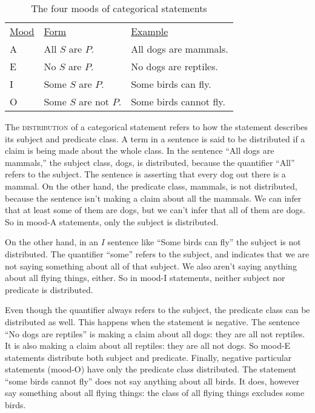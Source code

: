 \begin{table}[t]
\begin{tabu}{p{.1\linewidth}p{.3\linewidth}p{.3\linewidth}}
  \underline{Mood}& \underline{Form} & \underline{Example} \\
A & All $S$ are $P$.      & All dogs are mammals. \\
E & No $S$ are $P$.       & No dogs are reptiles. \\
I & Some $S$ are $P$.     & Some birds can fly. \\
O & Some $S$ are not $P$. & Some birds cannot fly.\\
\end{tabu}
\caption{The four moods of categorical statements}
\label{tab:moods}
\end{table}



The \textsc{\gls{distribution}} of a categorical statement refers to how the statement describes its subject and predicate class. A term in a sentence is said to be distributed \label{def:Distribution} if a claim is being made about the whole class. In the sentence ``All dogs are mammals,'' the subject class, dogs, is distributed, because the quantifier ``All'' refers to the subject. The sentence is asserting that every dog out there is a mammal. On the other hand, the predicate class, mammals, is not distributed, because the sentence isn't making a claim about all the mammals. We can infer that at least some of them are dogs, but we can't infer that all of them are dogs. So in mood-A statements, only the subject is distributed.

On the other hand, in an $I$ sentence like ``Some birds can fly'' the subject is not distributed. The quantifier ``some'' refers to the subject, and indicates that we are not saying something about all of that subject. We also aren't saying anything about all flying things, either. So in mood-I statements, neither subject nor predicate is distributed.

Even though the quantifier always refers to the subject, the predicate class can be distributed as well. This happens when the statement is negative. The sentence ``No dogs are reptiles'' is making a claim about all dogs: they are all not reptiles. It is also making a claim about all reptiles: they are all not dogs. So mood-E statements distribute both subject and predicate. Finally, negative particular statements (mood-O) have only the predicate class distributed. The statement ``some birds cannot fly'' does not say anything about all birds. It does, however say something about all flying things: the class of all flying things excludes some birds.

